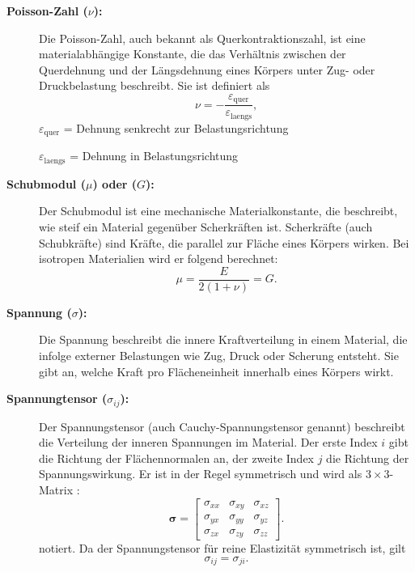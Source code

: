 \begin{description}
\item[\textbf{Poisson-Zahl ($\nu$):}]
Die Poisson-Zahl, auch bekannt als Querkontraktionszahl, ist eine
%
%
materialabhängige Konstante, die das Verhältnis zwischen der
Querdehnung und der Längsdehnung eines Körpers unter Zug- oder
%
Druckbelastung beschreibt.
Sie ist definiert als
	\begin{equation*}
		\nu=
		-\frac{\varepsilon_\text{quer}}{\varepsilon_\text{laengs}},
	\end{equation*}
	$\varepsilon_\text{quer}$ = Dehnung senkrecht zur Belastungsrichtung
	
	$\varepsilon_\text{laengs}$ = Dehnung in Belastungsrichtung
	
\item[\textbf{Schubmodul ($\mu$) oder ($G$):}]
Der Schubmodul ist eine mechanische Materialkonstante, die beschreibt,
wie steif ein Material gegenüber Scherkräften ist.
%
Scherkräfte (auch Schubkräfte) sind Kräfte, die parallel zur Fläche
eines Körpers wirken.
%
%
Bei isotropen Materialien wird er folgend berechnet:
	\begin{equation*}
		\mu = 
		\frac{E}{2(1 + \nu)} =
		G.
	\end{equation*}
\item[\textbf{Spannung ($\sigma$):}]
Die Spannung beschreibt die innere Kraftverteilung in einem Material,
die infolge externer Belastungen wie Zug, Druck oder Scherung
entsteht.
%
Sie gibt an, welche Kraft pro Flächeneinheit innerhalb eines Körpers wirkt.
	
\item[\textbf{Spannungtensor ($\sigma_{ij}$):}]
Der Spannungstensor (auch Cauchy-Spannungstensor genannt) beschreibt
%
die Verteilung der inneren Spannungen im Material.
%
Der erste Index $i$ gibt die Richtung der Flächennormalen an, der
zweite Index $j$ die Richtung der Spannungswirkung.
Er ist in der Regel symmetrisch und wird als $3\times 3$-Matrix
\cite{elastomechanik:Grundlagen_der_Elastizitaetstheorie}:
	\begin{equation*}
		\boldsymbol{\sigma} =
		\begin{bmatrix}
			\sigma_{xx} & \sigma_{xy} & \sigma_{xz} \\
			\sigma_{yx} & \sigma_{yy} & \sigma_{yz} \\
			\sigma_{zx} & \sigma_{zy} & \sigma_{zz}
		\end{bmatrix}.
	\end{equation*}
notiert.
Da der Spannungstensor für reine Elastizität symmetrisch ist, gilt
	\begin{equation*}
		\sigma_{ij} = 
		\sigma_{ji}.
	\end{equation*}
	

\end{description}
